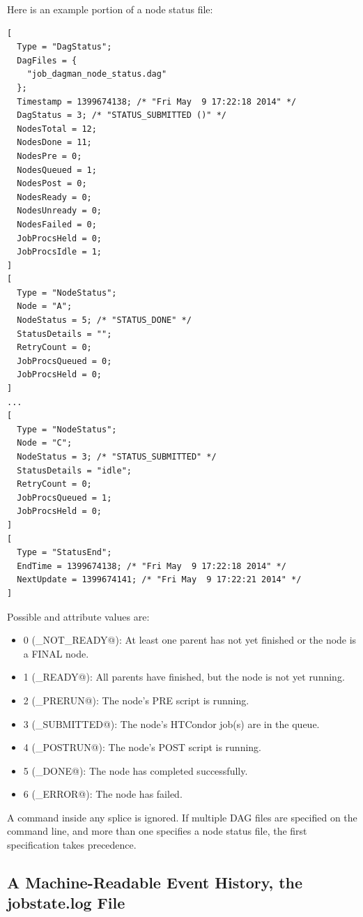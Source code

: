 Here is an example portion of a node status file:

\begin{verbatim}
[
  Type = "DagStatus";
  DagFiles = {
    "job_dagman_node_status.dag"
  };
  Timestamp = 1399674138; /* "Fri May  9 17:22:18 2014" */
  DagStatus = 3; /* "STATUS_SUBMITTED ()" */
  NodesTotal = 12;
  NodesDone = 11;
  NodesPre = 0;
  NodesQueued = 1;
  NodesPost = 0;
  NodesReady = 0;
  NodesUnready = 0;
  NodesFailed = 0;
  JobProcsHeld = 0;
  JobProcsIdle = 1;
]
[
  Type = "NodeStatus";
  Node = "A";
  NodeStatus = 5; /* "STATUS_DONE" */
  StatusDetails = "";
  RetryCount = 0;
  JobProcsQueued = 0;
  JobProcsHeld = 0;
]
...
[
  Type = "NodeStatus";
  Node = "C";
  NodeStatus = 3; /* "STATUS_SUBMITTED" */
  StatusDetails = "idle";
  RetryCount = 0;
  JobProcsQueued = 1;
  JobProcsHeld = 0;
]
[
  Type = "StatusEnd";
  EndTime = 1399674138; /* "Fri May  9 17:22:18 2014" */
  NextUpdate = 1399674141; /* "Fri May  9 17:22:21 2014" */
]
\end{verbatim}

Possible  and  attribute values are:

\begin{itemize}
\item 0 (\verb@STATUS_NOT_READY@): At least one parent has not yet finished
or the node is a FINAL node.
\item 1 (\verb@STATUS_READY@): All parents have finished, but the node is not
yet running.
\item 2 (\verb@STATUS_PRERUN@): The node's PRE script is running.
\item 3 (\verb@STATUS_SUBMITTED@): The node's HTCondor job(s) are in 
  the queue.
\item 4 (\verb@STATUS_POSTRUN@): The node's POST script is running.
\item 5 (\verb@STATUS_DONE@): The node has completed successfully.
\item 6 (\verb@STATUS_ERROR@): The node has failed.
\end{itemize}

A  command inside any splice is ignored.
If multiple DAG files are specified on the  command line,
and more than one specifies a node status file,
the first specification takes precedence.

\subsection{\label{sec:DAGJobstateLog}A Machine-Readable Event History, the jobstate.log File}

